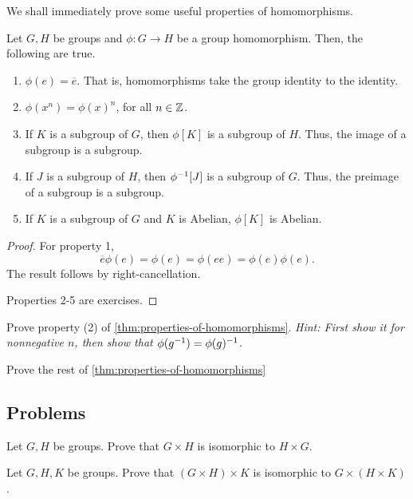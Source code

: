 \documentclass[./algebra-notes.tex]{subfiles}
\begin{document}
We shall immediately prove some useful properties of homomorphisms.
\begin{theorem}
\label{thm:properties-of-homomorphisms}
    Let $G, H$ be groups and $\phi: G \to H$ be a group homomorphism.
    Then, the following are true.
    \begin{enumerate}
        \item $\phi(e) = \overline e$. That is, homomorphisms take the group
        identity to the identity.
        \item $\phi(x^n) = \phi(x)^n$, for all $n \in \mathbb{Z}$.
        \item If $K$ is a subgroup of $G$, then $\phi[K]$ is a subgroup of $H$. Thus, the image of a subgroup is a subgroup.
        \item If $J$ is a subgroup of $H$, then $\phi\inv\paren*{J}$ is a
        subgroup of $G$. Thus, the preimage of a subgroup is a subgroup.
        \item If $K$ is a subgroup of $G$ and $K$ is Abelian, $\phi[K]$ is Abelian.
    \end{enumerate}
\end{theorem}
\begin{proof}
    For property 1, 
    \[
        \overline e \phi(e) = \phi(e) = \phi(ee) = \phi(e)\phi(e). 
    \]
    The result follows by right-cancellation.

    Properties 2-5 are exercises.
\end{proof}

\begin{exercise}
    Prove property (2) of \cref{thm:properties-of-homomorphisms}. \textit{Hint:
    First show it for nonnegative $n$, then show that $\phi(g^{-1}) =
    \phi(g)^{-1}$.}
\end{exercise}

\begin{exercise}
    Prove the rest of \cref{thm:properties-of-homomorphisms}
\end{exercise}

\subsection{Problems}

\begin{exercise}
    Let $G, H$ be groups. Prove that $G \times H$ is isomorphic to $H \times G$.
\end{exercise}

\begin{exercise}
    Let $G, H, K$ be groups. Prove that $(G \times H) \times K$ is isomorphic to
    $G \times (H \times K)$.
\end{exercise}
\end{document}
